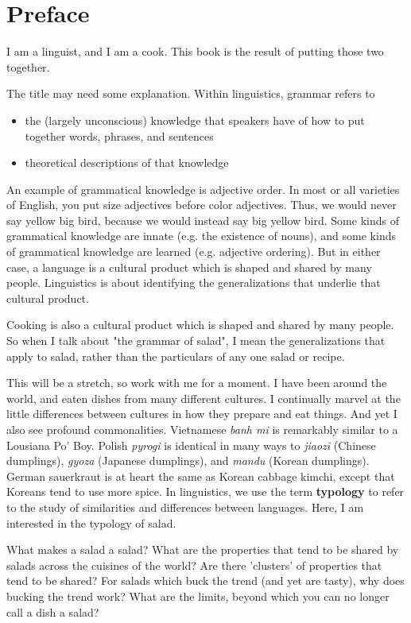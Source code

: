 \chapter{Preface}

I am a linguist, and I am a cook. This book is the result of putting those two together.

The title may need some explanation. Within linguistics, grammar refers to

\begin{itemize}
    \item the (largely unconscious) knowledge that speakers have of how to put together words, phrases, and sentences
    \item theoretical descriptions of that knowledge
\end{itemize}

An example of grammatical knowledge is adjective order. In most or all varieties of English, you put size adjectives before color adjectives. Thus, we would never say yellow big bird, because we would instead say big yellow bird. Some kinds of grammatical knowledge are innate (e.g. the existence of nouns), and some kinds of grammatical knowledge are learned (e.g. adjective ordering). But in either case, a language is a cultural product which is shaped and shared by many people. Linguistics is about identifying the generalizations that underlie that cultural product.

Cooking is also a cultural product which is shaped and shared by many people. So when I talk about "the grammar of salad", I mean the generalizations that apply to salad, rather than the particulars of any one salad or recipe.

This will be a stretch, so work with me for a moment. I have been around the world, and eaten dishes from many different cultures. I continually marvel at the little differences between cultures in how they prepare and eat things. And yet I also see profound commonalities. Vietnamese \textit{banh mi} is remarkably similar to a Lousiana Po' Boy. Polish \textit{pyrogi} is identical in many ways to \textit{jiaozi} (Chinese dumplings), \textit{gyoza} (Japanese dumplings), and \textit{mandu} (Korean dumplings). German sauerkraut is at heart the same as Korean cabbage kimchi, except that Koreans tend to use more spice. In linguistics, we use the term \textbf{typology} to refer to the study of similarities and differences between languages. Here, I am interested in the typology of salad.

What makes a salad a salad? What are the properties that tend to be shared by salads across the cuisines of the world? Are there 'clusters' of properties that tend to be shared? For salads which buck the trend (and yet are tasty), why does bucking the trend work? What are the limits, beyond which you can no longer call a dish a salad?

